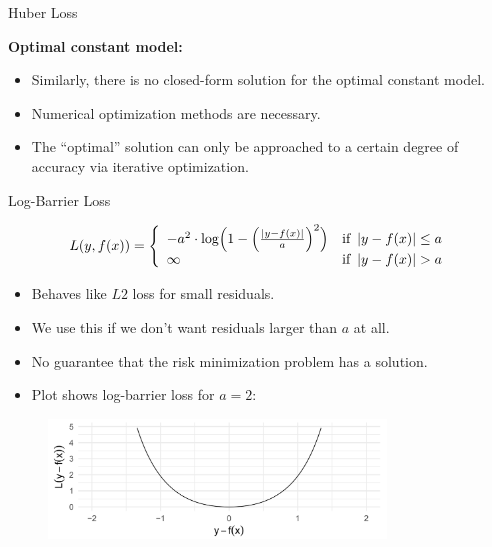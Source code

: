 \begin{vbframe}{Huber Loss}
\vspace*{0.2cm}

\textbf{Optimal constant model:}
\begin{itemize}
\item Similarly, there is no closed-form solution for the optimal constant model. 
\item Numerical optimization methods are necessary. 
\item The \enquote{optimal} solution can only be approached to a certain degree of accuracy via iterative optimization.
\end{itemize}

\end{vbframe}



\begin{vbframe}{Log-Barrier Loss}

\begin{small}
\[
  L(y, f(x)) = \left\{\begin{array}{lr}
        -a^{2} \cdot \log \Bigl( 1 - \Bigl(\frac{\left|y - f(x)\right|}{a}\Bigr)^2 \Bigr) & \text{if } \left|y-f(x)\right| \leq a \\
        \infty & \text{if } \left|y-f(x)\right|  > a
        \end{array}\right.
  \]
\end{small}

\begin{itemize}
\item Behaves like $L2$ loss for small residuals.
\item We use this if we don't want residuals larger than $a$ at all.
\item No guarantee that the risk minimization problem has a solution.
\item Plot shows log-barrier loss for $a=2$:
\end{itemize}

\begin{figure}
\includegraphics[width = 0.8\textwidth]{figure_man/log-barrier01.png}
\end{figure}


\end{vbframe}



